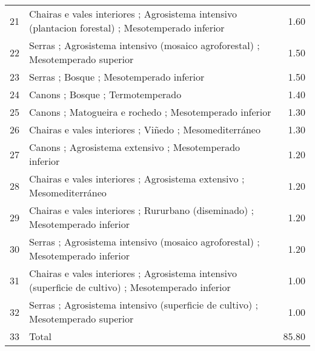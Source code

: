 \begin{table}[p]
\begin{tabular}{rlr}
  21 & Chairas e vales interiores ; Agrosistema intensivo (plantacion forestal) ; Mesotemperado inferior & 1.60 \\ 
  22 & Serras ; Agrosistema intensivo (mosaico agroforestal) ; Mesotemperado superior & 1.50 \\ 
  23 & Serras ; Bosque ; Mesotemperado inferior & 1.50 \\ 
  24 & Canons ; Bosque ; Termotemperado & 1.40 \\ 
  25 & Canons ; Matogueira e rochedo ; Mesotemperado inferior & 1.30 \\ 
  26 & Chairas e vales interiores ; Viñedo ; Mesomediterráneo & 1.30 \\ 
  27 & Canons ; Agrosistema extensivo ; Mesotemperado inferior & 1.20 \\ 
  28 & Chairas e vales interiores ; Agrosistema extensivo ; Mesomediterráneo & 1.20 \\ 
  29 & Chairas e vales interiores ; Rururbano (diseminado) ; Mesotemperado inferior & 1.20 \\ 
  30 & Serras ; Agrosistema intensivo (mosaico agroforestal) ; Mesotemperado inferior & 1.20 \\ 
  31 & Chairas e vales interiores ; Agrosistema intensivo (superficie de cultivo) ; Mesotemperado inferior & 1.00 \\ 
  32 & Serras ; Agrosistema intensivo (superficie de cultivo) ; Mesotemperado superior & 1.00 \\ 
  33 & Total & 85.80 \\ 
   \hline
\end{tabular}
\end{table}

